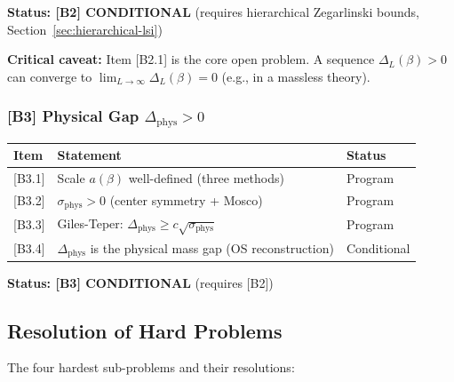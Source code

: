 \textbf{Status: [B2] CONDITIONAL} (requires hierarchical Zegarlinski bounds, Section~\ref{sec:hierarchical-lsi})

\textbf{Critical caveat:} Item [B2.1] is the core open problem. A sequence $\Delta_L(\beta) > 0$ 
can converge to $\lim_{L \to \infty} \Delta_L(\beta) = 0$ (e.g., in a massless theory).

\subsubsection{[B3] Physical Gap \texorpdfstring{$\Delta_{\text{phys}} > 0$}{Delta-phys > 0}}

\begin{center}
\begin{tabular}{|l|l|l|}
\hline
\textbf{Item} & \textbf{Statement} & \textbf{Status} \\
\hline
\mbox{[B3.1]} & Scale $a(\beta)$ well-defined (three methods) & Program \\
\mbox{[B3.2]} & $\sigma_{\text{phys}} > 0$ (center symmetry + Mosco) & Program \\
\mbox{[B3.3]} & Giles-Teper: $\Delta_{\text{phys}} \geq c\sqrt{\sigma_{\text{phys}}}$ & Program \\
\mbox{[B3.4]} & $\Delta_{\text{phys}}$ is the physical mass gap (OS reconstruction) & Conditional \\
\hline
\end{tabular}
\end{center}

\textbf{Status: [B3] CONDITIONAL} (requires [B2])

\subsection{Resolution of Hard Problems}

The four hardest sub-problems and their resolutions:

